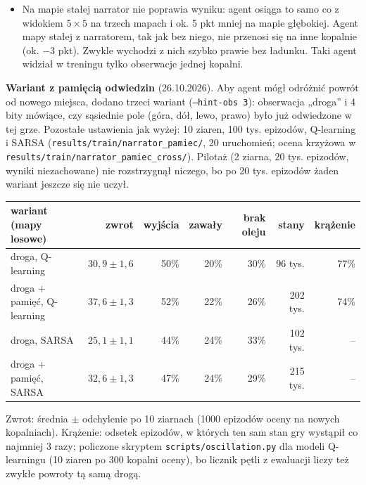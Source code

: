 \documentclass[11pt,a4paper]{article}
\begin{document}
\begin{itemize}
  wychodzi prawie od razu ($-2{,}9$, głębokość ok. $2{,}4$), a na mapie z zawałem
  korytarza w 83\% epizodów kończy mu się olej ($-21{,}7$). Przyczyn tych różnic nie
  badano osobno. Na mapie z zawałem korytarza droga do wyjścia zmienia się po
  wydobyciu, co może być jedną z nich.
  \item Na mapie stałej narrator nie poprawia wyniku: agent osiąga to samo co z widokiem
  $5\times5$ na trzech mapach i ok. 5 pkt mniej na mapie głębokiej. Agent mapy stałej
  z narratorem, tak jak bez niego, nie przenosi się na inne kopalnie (ok. $-3$ pkt).
  Zwykle wychodzi z nich szybko prawie bez ładunku. Taki agent widział w treningu
  tylko obserwacje jednej kopalni.
\end{itemize}
\textbf{Wariant z pamięcią odwiedzin} (26.10.2026). Aby agent mógł odróżnić powrót
od nowego miejsca, dodano trzeci wariant (\texttt{--hint-obs 3}): obserwacja „droga”
i 4 bity mówiące, czy sąsiednie pole (góra, dół, lewo, prawo) było już odwiedzone
w tej grze. Pozostałe ustawienia jak wyżej: 10 ziaren, 100 tys. epizodów,
Q-learning i SARSA (\texttt{results/\allowbreak train/\allowbreak narrator\_pamiec/},
20 uruchomień; ocena krzyżowa w
\texttt{results/\allowbreak train/\allowbreak narrator\_pamiec\_cross/}). Pilotaż
(2 ziarna, 20 tys. epizodów, wyniki niezachowane) nie rozstrzygnął niczego, bo po
20 tys. epizodów żaden wariant jeszcze się nie uczył.

\begin{center}
\small
\begin{tabular}{@{}lrrrrrr@{}}
\toprule
wariant (mapy losowe) & zwrot & wyjścia & zawały & brak oleju & stany & krążenie \\
\midrule
droga, Q-learning & $30{,}9\pm1{,}6$ & 50\% & 20\% & 30\% & 96 tys. & 77\% \\
droga + pamięć, Q-learning & $37{,}6\pm1{,}3$ & 52\% & 22\% & 26\% & 202 tys. & 74\% \\
droga, SARSA & $25{,}1\pm1{,}1$ & 44\% & 24\% & 33\% & 102 tys. & -- \\
droga + pamięć, SARSA & $32{,}6\pm1{,}3$ & 47\% & 24\% & 29\% & 215 tys. & -- \\
\bottomrule
\end{tabular}
\end{center}
Zwrot: średnia $\pm$ odchylenie po 10 ziarnach (1000 epizodów oceny na nowych
kopalniach). Krążenie: odsetek epizodów, w których ten sam stan gry wystąpił co
najmniej 3 razy; policzone skryptem \texttt{scripts/\allowbreak oscillation.py} dla modeli Q-learningu (10 ziaren po 300
kopalni oceny), bo licznik pętli z ewaluacji liczy też zwykłe powroty tą samą drogą.
\end{document}
